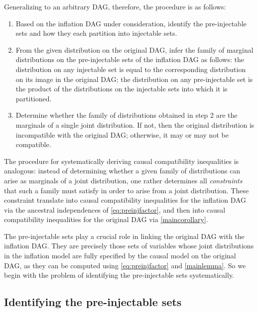 \documentclass[aps,english,superscriptaddress,onecolumn,twoside,longbibliography,pra,floatfix,fleqn,nofootinbib]{revtex4-1}%
\theoremstyle{definition}
\begin{document}
Generalizing to an arbitrary DAG, therefore, the procedure is as follows:
\begin{enumerate}
\item Based on the inflation DAG under consideration, identify the pre-injectable sets and how they each partition into injectable sets.
\item From the given distribution on the original DAG, infer the family of marginal distributions on the pre-injectable sets of the inflation DAG as follows: the distribution on any injectable set is equal to the corresponding distribution on its image in the original DAG; the distribution on any pre-injectable set is the product of the distributions on the injectable sets into which it is partitioned.
\item Determine whether the family of distributions obtained in step 2 are the marginals of a single joint distribution. If not, then the original distribution is incompatible with the original DAG; otherwise, it may or may not be compatible.
\end{enumerate}

The procedure for systematically deriving causal compatibility inequalities is analogous: instead of determining whether a given family of distributions can arise as marginals of a joint distribution, one rather determines all \emph{constraints} that such a family must satisfy in order to arise from a joint distribution. These constraint translate into causal compatibility inequalities for the inflation DAG via the ancestral independences of \cref{eq:preinjfactor}, and then into causal compatibility inequalities for the original DAG via \cref{maincorollary}.

The pre-injectable sets play a crucial role in linking the original DAG with the inflation DAG.  They are precisely those sets of variables whose joint distributions in the inflation model are fully specified by the causal model on the original DAG, as they can be computed using \cref{eq:preinjfactor} and \cref{mainlemma}. So we begin with the problem of identifying the pre-injectable sets systematically.

\subsection{Identifying the pre-injectable sets}
\label{step:findpreinjectable}
\end{document}
